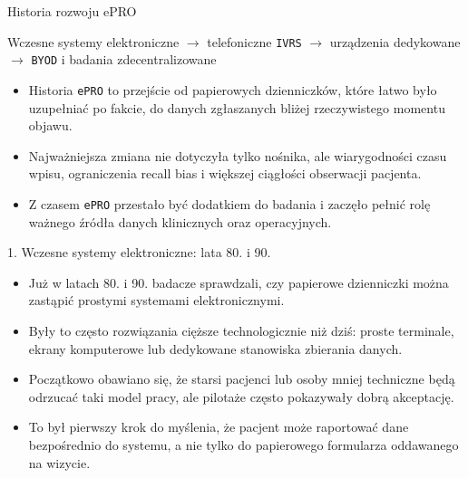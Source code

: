 \begin{frame}{Historia rozwoju ePRO}
  \begin{center}
    \Large
    Wczesne systemy elektroniczne $\rightarrow$ telefoniczne \texttt{IVRS} $\rightarrow$ urządzenia dedykowane $\rightarrow$ \texttt{BYOD} i badania zdecentralizowane
  \end{center}

  \vspace{0.45cm}

  \begin{itemize}
    \item Historia \texttt{ePRO} to przejście od papierowych dzienniczków, które łatwo było uzupełniać po fakcie, do danych zgłaszanych bliżej rzeczywistego momentu objawu.
    \item Najważniejsza zmiana nie dotyczyła tylko nośnika, ale wiarygodności czasu wpisu, ograniczenia recall bias i większej ciągłości obserwacji pacjenta.
    \item Z czasem \texttt{ePRO} przestało być dodatkiem do badania i zaczęło pełnić rolę ważnego źródła danych klinicznych oraz operacyjnych.
  \end{itemize}
\end{frame}

\begin{frame}{1. Wczesne systemy elektroniczne: lata 80. i 90.}
  \begin{itemize}
    \item Już w latach 80. i 90. badacze sprawdzali, czy papierowe dzienniczki można zastąpić prostymi systemami elektronicznymi.
    \item Były to często rozwiązania cięższe technologicznie niż dziś: proste terminale, ekrany komputerowe lub dedykowane stanowiska zbierania danych.
    \item Początkowo obawiano się, że starsi pacjenci lub osoby mniej techniczne będą odrzucać taki model pracy, ale pilotaże często pokazywały dobrą akceptację.
    \item To był pierwszy krok do myślenia, że pacjent może raportować dane bezpośrednio do systemu, a nie tylko do papierowego formularza oddawanego na wizycie.
  \end{itemize}
\end{frame}

